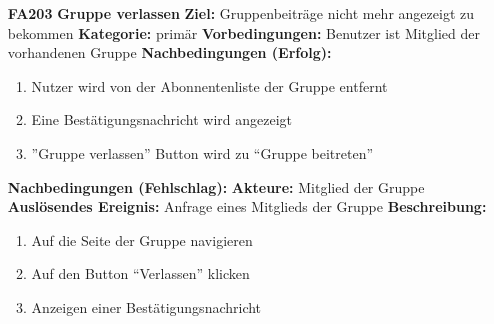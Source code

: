 \documentclass[parskip=full]{scrartcl}
\begin{document}
\begin{itemize}[nosep]
			\item[\textbf{FA203}]\textbf{Gruppe verlassen}
				\newline \textbf{Ziel:} Gruppenbeiträge nicht mehr angezeigt zu bekommen
				\newline \textbf{Kategorie:} primär
				\newline \textbf{Vorbedingungen:} Benutzer ist Mitglied der vorhandenen Gruppe
				\newline \textbf{Nachbedingungen (Erfolg):} 
				\begin{enumerate}[nosep]
					\item Nutzer wird von der Abonnentenliste der Gruppe entfernt
					\item Eine Bestätigungsnachricht wird angezeigt
					\item ”Gruppe verlassen” Button wird zu “Gruppe beitreten” 
				\end{enumerate}
				\textbf{Nachbedingungen (Fehlschlag):}
				\newline \textbf{Akteure:} Mitglied der Gruppe
				\newline \textbf{Auslösendes Ereignis:} Anfrage eines Mitglieds der Gruppe
				\newline \textbf{Beschreibung:}
				\begin{enumerate}[nosep]
					\item Auf die Seite der Gruppe navigieren
					\item Auf den Button “Verlassen” klicken
					\item Anzeigen einer Bestätigungsnachricht\\
				\end{enumerate}
							
		
						
		\end{itemize}
		
\end{document}
